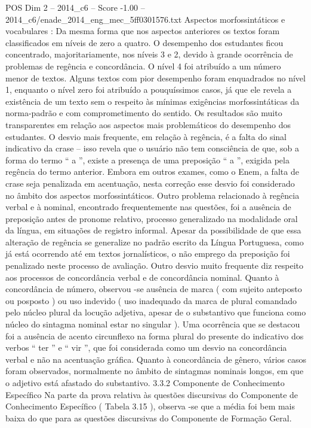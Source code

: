 \begin{textsample}{POS Dim 2 – 2014\_c6 – Score -1.00 – 2014\_c6/enade\_2014\_eng\_mec\_5ff0301576.txt}
Aspectos morfossintáticos e vocabulares : Da mesma forma que nos aspectos anteriores os textos foram classificados em níveis de zero a quatro.
O desempenho dos estudantes ficou concentrado, majoritariamente, nos níveis 3 e 2, devido à grande ocorrência de problemas de regência e concordância.
O nível 4 foi atribuído a um número menor de textos.
Alguns textos com pior desempenho foram enquadrados no nível 1, enquanto o nível zero foi atribuído a pouquíssimos casos, já que ele revela a existência de um texto sem o respeito às mínimas exigências morfossintáticas da norma-padrão e com comprometimento do sentido.
Os resultados são muito transparentes em relação aos aspectos mais problemáticos do desempenho dos estudantes.
O desvio mais frequente, em relação à regência, é a falta do sinal indicativo da crase – isso revela que o usuário não tem consciência de que, sob a forma do termo “ a ”, existe a presença de uma preposição “ a ”, exigida pela regência do termo anterior.
Embora em outros exames, como o Enem, a falta de crase seja penalizada em acentuação, nesta correção esse desvio foi considerado no âmbito dos aspectos morfossintáticos.
Outro problema relacionado à regência verbal e à nominal, encontrado frequentemente nas questões, foi a ausência de preposição antes de pronome relativo, processo generalizado na modalidade oral da língua, em situações de registro informal.
Apesar da possibilidade de que essa alteração de regência se generalize no padrão escrito da Língua Portuguesa, como já está ocorrendo até em textos jornalísticos, o não emprego da preposição foi penalizado neste processo de avaliação.
Outro desvio muito frequente diz respeito aos processos de concordância verbal e de concordância nominal.
Quanto à concordância de número, observou -se ausência de marca ( com sujeito anteposto ou posposto ) ou uso indevido ( uso inadequado da marca de plural comandado pelo núcleo plural da locução adjetiva, apesar de o substantivo que funciona como núcleo do sintagma nominal estar no singular ).
Uma ocorrência que se destacou foi a ausência de acento circunflexo na forma plural do presente do indicativo dos verbos “ ter ” e “ vir ”, que foi considerada como um desvio na concordância verbal e não na acentuação gráfica.
Quanto à concordância de gênero, vários casos foram observados, normalmente no âmbito de sintagmas nominais longos, em que o adjetivo está afastado do substantivo. 3.3.2 Componente de Conhecimento Específico Na parte da prova relativa às questões discursivas do Componente de Conhecimento Específico ( Tabela 3.15 ), observa -se que a média foi bem mais baixa do que para as questões discursivas do Componente de Formação Geral.

\end{textsample}
